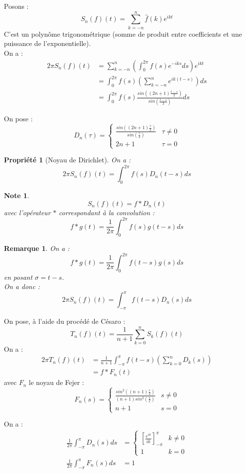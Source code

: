 \documentclass[a4paper, oneside]{report}
\theoremstyle{break}
\newtheorem{propr}[thm]{Propriété}
\newtheorem{remar}[thm]{Remarque}
\newtheorem{note}[thm]{Note}
\newcommand{\fracun}[1]{\frac{1}{#1}}
\begin{document}
Posons :
$$S_n(f)(t)= \sum_{k=-n}^{n}\widehat{f}(k)e^{ikt}$$
C'est un polynôme trigonométrique (somme de produit entre coefficients et une puissance de l'exponentielle).\\
On a :
\begin{align*}
2\pi S_n(f)(t)&=\sum_{k=-n}^{n}(\int_0^{2\pi}f(s)e^{-iks}ds)e^{ikt}\\
&=\int_0^{2\pi}f(s)(\sum_{k=-n}^{n}e^{ik(t-s)})ds\\
&= \int_0^{2\pi}f(s)\frac{sin((2n + 1)\frac{t-s}{2})}{sin(\frac{t-s}{2})}ds
\end{align*}

On pose :
$$D_n(\tau) = \left\{
\begin{array}{ll}
\frac{sin((2n + 1)\frac{\tau}{2})}{sin(\frac{\tau}{2})} & \tau \neq 0\\
2n+1 & \tau = 0
\end{array}
\right.$$

\begin{propr}[Noyau de Dirichlet]
On a :
$$2\pi S_n(f)(t)=\int_0^{2\pi}f(s)D_n(t-s)ds$$
\end{propr}

\begin{note}
$$S_n(f)(t)=f * D_n(t)$$
avec l'opérateur $*$ correspondant à la convolution :
$$f*g(t)= \fracun{2\pi}\int_0^{2\pi}f(s)g(t-s)ds$$
\end{note}

\begin{remar}
On a :
$$f*g(t)= \fracun{2\pi}\int_0^{2\pi}f(t-s)g(s)ds$$
en posant $\sigma = t-s$.\\
On a donc :
$$2\pi S_n(f)(t)=\int_{-\pi}^{\pi}f(t-s)D_n(s)ds$$
\end{remar}

On pose, à l'aide du procédé de Césaro :
$$T_n(f)(t)=\fracun{n+1}\sum_{k=0}^nS_k(f)(t)$$
On a :
\begin{align*}
2\pi T_n(f)(t)&=\fracun{n+1}\int_{-\pi}^\pi f(t-s)(\sum_{k=0}^n D_k(s))\\
&=f*F_n(t)
\end{align*}
avec $F_n$ le noyau de Fejer :
$$F_n(s) = \left\{
\begin{array}{ll}
\frac{sin^2((n + 1)\frac{s}{2})}{(n+1)sin^2(\frac{s}{2})} & s \neq 0\\
n+1 & s = 0
\end{array}
\right.$$

On a :
\begin{align*}
\fracun{2\pi}\int_{-\pi}^{\pi} D_n(s)ds &= \left\{\begin{array}{ll}
[\frac{e^{ik}}{ik}]_{-\pi}^{\pi}&k\neq 0\\
1 & k=0
\end{array}\right.\\
\fracun{2\pi}\int_{-\pi}^{\pi} F_n(s)ds &=1
\end{align*}
\end{document}
